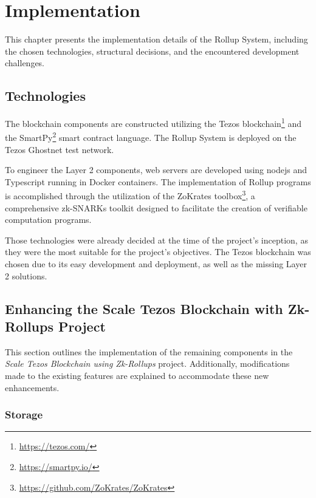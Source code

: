 \chapter{Implementation\label{cha:chapter5}}

This chapter presents the implementation details of the Rollup System, including the chosen technologies, structural decisions, and the encountered development challenges.

\section{Technologies\label{sec:technologies}}

The blockchain components are constructed utilizing the Tezos blockchain\footnote{\url{https://tezos.com/}} and the SmartPy\footnote{\url{https://smartpy.io/}} smart contract language. The Rollup System is deployed on the Tezos Ghostnet test network.

To engineer the Layer 2 components, web servers are developed using nodejs and Typescript running in Docker containers. The implementation of Rollup programs is accomplished through the utilization of the ZoKrates toolbox\footnote{\url{https://github.com/ZoKrates/ZoKrates}}, a comprehensive zk-SNARKs toolkit designed to facilitate the creation of verifiable computation programs.

Those technologies were already decided at the time of the project's inception, as they were the most suitable for the project's objectives. The Tezos blockchain was chosen due to its easy development and deployment, as well as the missing Layer 2 solutions.

\section{Enhancing the Scale Tezos Blockchain with Zk-Rollups Project}
This section outlines the implementation of the remaining components in the \textit{Scale Tezos Blockchain using Zk-Rollups} project. Additionally, modifications made to the existing features are explained to accommodate these new enhancements.

\subsection{Storage}


